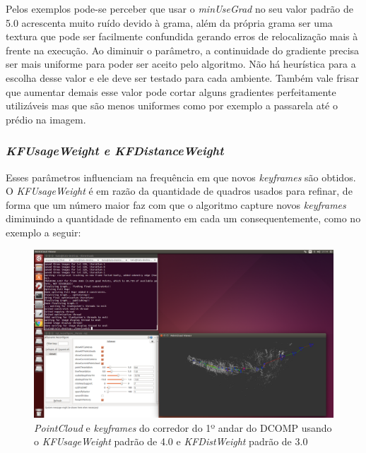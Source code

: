 Pelos exemplos pode-se perceber que usar o \textit{minUseGrad} no seu valor padrão de 5.0 acrescenta muito ruído devido à grama, além da própria grama ser uma textura que pode ser facilmente confundida gerando erros de relocalização mais à frente na execução. Ao diminuir o parâmetro, a continuidade do gradiente precisa ser mais uniforme para poder ser aceito pelo algoritmo. Não há heurística para a escolha desse valor e ele deve ser testado para cada ambiente. Também vale frisar que aumentar demais esse valor pode cortar alguns gradientes perfeitamente utilizáveis mas que são menos uniformes como por exemplo a passarela até o prédio na imagem.

\subsubsection{\textit{KFUsageWeight e KFDistanceWeight}}


Esses parâmetros influenciam na frequência em que novos \textit{keyframes} são obtidos. O \textit{KFUsageWeight} é em razão da quantidade de quadros usados para refinar, de forma que um número maior faz com que o algoritmo capture novos \textit{keyframes} diminuindo a quantidade de refinamento em cada um consequentemente, como no exemplo a seguir:

\begin{figure}[H]
	\centering
		\includegraphics[width= \textwidth]{Imagens/figura3-33.png}
	\caption{\textit{PointCloud} e \textit{keyframes} do corredor do 1º andar do DCOMP usando o \textit{KFUsageWeight} padrão de 4.0 e \textit{KFDistWeight} padrão de 3.0}
	\label{fig3:31}
\end{figure}

